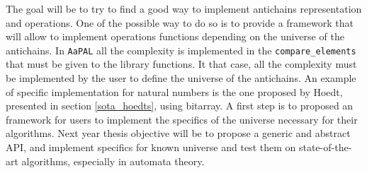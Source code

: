 \documentclass[11pt,a4paper]{article}
\theoremstyle{definition}
\begin{document}

The goal will be to try to find a good
way to implement antichains representation
and operations. One of the possible way to do so is to provide
a framework that will allow to implement
operations functions
depending on the universe of the antichains.
In \texttt{AaPAL} all the complexity
is implemented in the \texttt{compare\_elements} that must be given
to the library functions. It that case, all the complexity
must be implemented by the user to define the universe of the antichains.
An example of specific implementation for natural numbers is the one
proposed by Hoedt, presented in section \ref{sota_hoedts},
using bitarray. A first step
is to proposed an framework for users to implement the specifics of the
universe necessary for their algorithms. Next year thesis objective will
be to propose a generic and abstract API, and implement specifics
for known universe and test them on state-of-the-art algorithms,
especially in automata theory.


\newpage



\end{document}
